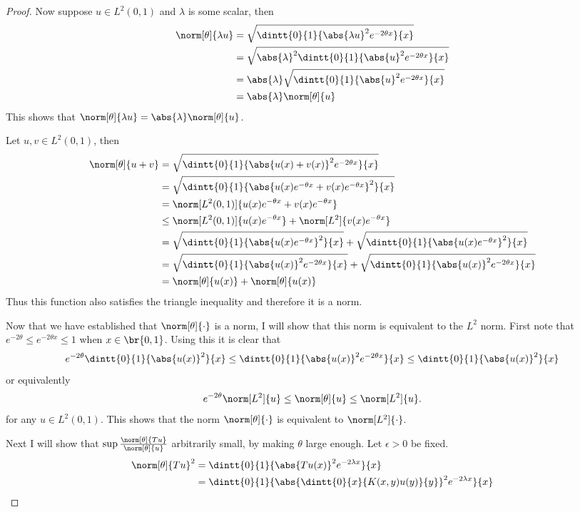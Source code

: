 \documentclass[11pt, oneside]{article}
\begin{document}
\begin{enumerate}
\begin{proof}
      Now suppose $u \in L^2(0, 1)$ and $\lambda$ is some scalar, then
      \begin{align*}
        \norm[\theta]{\lambda u} &= \sqrt{\dintt{0}{1}{\abs{\lambda u}^2e^{-2\theta x}}{x}} \\
        &= \sqrt{\abs{\lambda}^2 \dintt{0}{1}{\abs{u}^2e^{-2\theta x}}{x}} \\
        &= \abs{\lambda} \sqrt{\dintt{0}{1}{\abs{u}^2e^{-2\theta x}}{x}} \\
        &= \abs{\lambda} \norm[\theta]{u}
      \end{align*}
      This shows that $\norm[\theta]{\lambda u} = \abs{\lambda} \norm[\theta]{u}$.

      Let $u, v \in L^2(0, 1)$, then
      \begin{align*}
        \norm[\theta]{u + v} &= \sqrt{\dintt{0}{1}{\abs{u(x) + v(x)}^2e^{-2\theta x}}{x}} \\
        &= \sqrt{\dintt{0}{1}{\abs{u(x)e^{-\theta x} + v(x)e^{-\theta x}}^2}{x}} \\
        &= \norm[L^2(0, 1)]{u(x)e^{-\theta x} + v(x)e^{-\theta x}} \\
        &\le \norm[L^2(0, 1)]{u(x)e^{-\theta x}} + \norm[L^2]{v(x)e^{-\theta x}} \\
        &= \sqrt{\dintt{0}{1}{\abs{u(x)e^{-\theta x}}^2}{x}} + \sqrt{\dintt{0}{1}{\abs{u(x)e^{-\theta x}}^2}{x}} \\
        &= \sqrt{\dintt{0}{1}{\abs{u(x)}^2e^{-2\theta x}}{x}} + \sqrt{\dintt{0}{1}{\abs{u(x)}^2e^{-2\theta x}}{x}} \\
        &= \norm[\theta]{u(x)} + \norm[\theta]{u(x)}
      \end{align*}
      Thus this function also satisfies the triangle inequality and therefore
      it is a norm.

      Now that we have established that $\norm[\theta]{\cdot}$ is a norm, I will
      show that this norm is equivalent to the $L^2$ norm.
      First note that $e^{-2\theta} \le e^{-2\theta x} \le 1$ when
      $x \in \br{0, 1}$.
      Using this it is clear that
      \[
        e^{-2\theta} \dintt{0}{1}{\abs{u(x)}^2}{x} \le \dintt{0}{1}{\abs{u(x)}^2 e^{-2\theta x}}{x} \le \dintt{0}{1}{\abs{u(x)}^2}{x}
      \]
      or equivalently
      \[
        e^{-2\theta} \norm[L^2]{u} \le \norm[\theta]{u} \le \norm[L^2]{u}.
      \]
      for any $u \in L^2(0, 1)$.
      This shows that the norm $\norm[\theta]{\cdot}$ is equivalent to
      $\norm[L^2]{\cdot}$.

      Next I will show that $\sup \frac{\norm[\theta]{Tu}}{\norm[\theta]{u}}$
      arbitrarily small, by making $\theta$ large enough.
      Let $\epsilon > 0$ be fixed.
      \begin{align*}
        \norm[\theta]{Tu}^2 &= \dintt{0}{1}{\abs{Tu(x)}^2 e^{-2\lambda x}}{x} \\
        &= \dintt{0}{1}{\abs{\dintt{0}{x}{K(x, y)u(y)}{y}}^2 e^{-2\lambda x}}{x} \\
      \end{align*}


\end{proof}
\end{enumerate}
\end{document}
